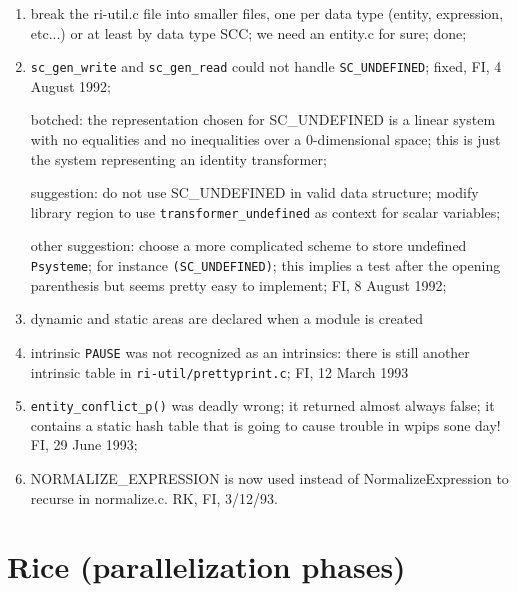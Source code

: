 \begin{enumerate}

  \item break the ri-util.c file into smaller files, one per data type
	(entity, expression, etc...) or at least by data type SCC; we
	need an entity.c for sure; done;

  \item \verb+sc_gen_write+ and \verb+sc_gen_read+ could not handle
	\verb+SC_UNDEFINED+; fixed, FI, 4 August 1992;

	botched: the representation chosen for SC_UNDEFINED is a linear system
	with no equalities and no inequalities over a 0-dimensional space;
	this is just the system representing an identity transformer;

	suggestion: do not use SC_UNDEFINED in valid data structure;
	modify library region to use \verb+transformer_undefined+ as
	context for scalar variables;

	other suggestion: choose a more complicated scheme to store
	undefined \verb+Psysteme+; for instance \verb+(SC_UNDEFINED)+;
	this implies a test after the opening parenthesis but seems
	pretty easy to implement; FI, 8 August 1992;

  \item dynamic and static areas are declared when a module is created

  \item intrinsic \verb+PAUSE+ was not recognized as an intrinsics:
	there is still another intrinsic table in
	\verb+ri-util/prettyprint.c+;
	FI, 12 March 1993

  \item \verb+entity_conflict_p()+ was deadly wrong; it returned almost
	always false; it contains a static hash table that is going to
	cause trouble in wpips sone day! FI, 29 June 1993;


  \item NORMALIZE\_EXPRESSION is now used instead of
	NormalizeExpression to recurse in normalize.c. RK, FI, 3/12/93.


\end{enumerate}

\section{Rice (parallelization phases)}

